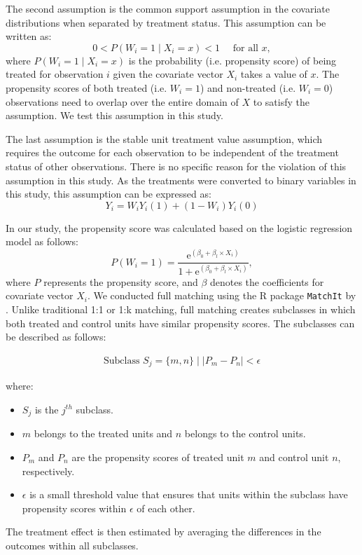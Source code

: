 \documentclass[preprint,12pt, authoryear]{elsarticle}
\begin{document}
The second assumption is the common support assumption in the covariate distributions when separated by treatment status. 
This assumption can be written as:
\begin{equation}
0<P\left(W_i=1 \mid X_i=x\right)<1 \quad \text { for all } x,
\end{equation}
where $P\left(W_i=1 \mid X_i=x\right)$ is the probability (i.e. propensity score) of being treated for observation $i$ given the covariate vector $X_i$ takes a value of $x$. 
The propensity scores of both treated (i.e. $W_i=1$) and non-treated (i.e. $W_i=0$) observations need to overlap over the entire domain of $X$ to satisfy the assumption. We test this assumption in this study. 

The last assumption is the stable unit treatment value assumption, which requires the outcome for each observation to be independent of the treatment status of other observations. There is no specific reason for the violation of this assumption in this study. As the treatments were converted to binary variables in this study, this assumption can be expressed as:
\begin{equation}
Y_i=W_i Y_i(1)+\left(1-W_i\right) Y_i(0)
\end{equation}

In our study, the propensity score was calculated based on the logistic regression model as follows:
\begin{equation}
P(W_i=1) = \frac{\mathrm{e}^{\left(\beta_0 + \beta_l \times X_i\right)}}{1+\mathrm{e}^{\left(\beta_0 + \beta_l \times X_i\right)}},
\end{equation}
where $P$ represents the propensity score, and $\beta$ denotes the coefficients for covariate vector $X_i$. 
We conducted full matching using the R package \texttt{MatchIt} by \citet{ho_matchit_2011}. Unlike traditional 1:1 or 1:k matching, full matching creates subclasses in which both treated and control units have similar propensity scores. The subclasses can be described as follows:

\begin{equation}
\begin{aligned}
\text{Subclass } S_j = \{ m,n \} \mid |P_m - P_n| < \epsilon
\end{aligned}
\end{equation}

where:
\begin{itemize}
    \item \( S_j \) is the \( j^{th} \) subclass.
    \item \( m \) belongs to the treated units and \( n \) belongs to the control units.
    \item \( P_m \) and \( P_n \) are the propensity scores of treated unit \( m \) and control unit \( n \), respectively.
    \item \( \epsilon \) is a small threshold value that ensures that units within the subclass have propensity scores within \( \epsilon \) of each other.
\end{itemize}
The treatment effect is then estimated by averaging the differences in the outcomes within all subclasses.
\end{document}
